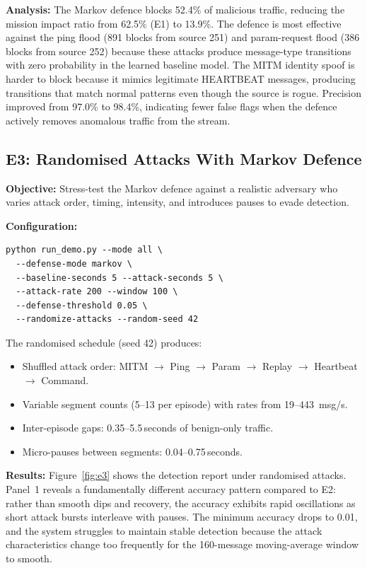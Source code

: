 \textbf{Analysis:}
The Markov defence blocks 52.4\% of malicious traffic, reducing the mission impact ratio from 62.5\% (E1) to 13.9\%.
The defence is most effective against the ping flood (891 blocks from source 251) and param-request flood (386 blocks from source 252) because these attacks produce message-type transitions with zero probability in the learned baseline model.
The MITM identity spoof is harder to block because it mimics legitimate HEARTBEAT messages, producing transitions that match normal patterns even though the source is rogue.
Precision improved from 97.0\% to 98.4\%, indicating fewer false flags when the defence actively removes anomalous traffic from the stream.

\subsection{E3: Randomised Attacks With Markov Defence}

\textbf{Objective:} Stress-test the Markov defence against a realistic adversary who varies attack order, timing, intensity, and introduces pauses to evade detection.

\textbf{Configuration:}
\begin{verbatim}
python run_demo.py --mode all \
  --defense-mode markov \
  --baseline-seconds 5 --attack-seconds 5 \
  --attack-rate 200 --window 100 \
  --defense-threshold 0.05 \
  --randomize-attacks --random-seed 42
\end{verbatim}

The randomised schedule (seed 42) produces:
\begin{itemize}
    \item Shuffled attack order: MITM $\to$ Ping $\to$ Param $\to$ Replay $\to$ Heartbeat $\to$ Command.
    \item Variable segment counts (5--13 per episode) with rates from 19--443~msg/s.
    \item Inter-episode gaps: 0.35--5.5\,seconds of benign-only traffic.
    \item Micro-pauses between segments: 0.04--0.75\,seconds.
\end{itemize}

\textbf{Results:}
Figure~\ref{fig:e3} shows the detection report under randomised attacks.
Panel~1 reveals a fundamentally different accuracy pattern compared to E2: rather than smooth dips and recovery, the accuracy exhibits rapid oscillations as short attack bursts interleave with pauses.
The minimum accuracy drops to 0.01, and the system struggles to maintain stable detection because the attack characteristics change too frequently for the 160-message moving-average window to smooth.

